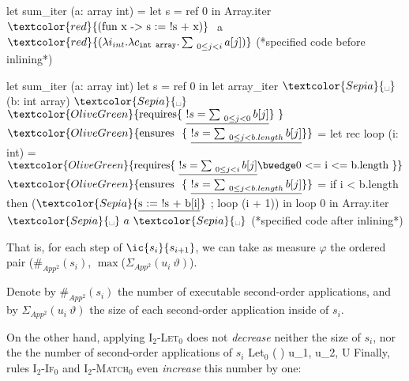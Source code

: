 \begin{adjustwidth}{-4em}{-2em}
\begin{footnotesize}
\begin{minipage}[t]{0.3\linewidth}
\begin{whycode}
   let sum_iter (a: array int) =		 
     let s = ref 0 in 
     Array.iter $\textcolor{red}{\text{(fun x -> s := !s + x)}}~$ a
                $\textcolor{red}{(\lambda i_{int}.\lambda c_{\texttt{int array}}. \sum_{~0\leq j < i} a[j])}$                                  
           (*specified code before inlining*)
\end{whycode}
\end{minipage}\hfill\vline
\begin{minipage}[t]{0.48\linewidth}
	\begin{whycode}  
   let sum_iter (a: array int)		
     let s = ref 0 in
     let array_iter $\textcolor{Sepia}{\text{\textvisiblespace}}$ (b: int array) $\textcolor{Sepia}{\text{\textvisiblespace}}$
     $\textcolor{OliveGreen}{\text{requires} \{~\underline{!s = \sum_{~0\leq j < 0} b[j]}}~\}$      
     $\textcolor{OliveGreen}{\text{ensures~~}\{~\underline{!s = \sum_{~0\leq j < b.length} b[j]}\}}$    
     = let rec loop (i: int) = 
         $\textcolor{OliveGreen}{ \text{requires} \{~\underline{!s = \sum_{~0\leq j < i} b[j] } \bwedge \text{0 <= i <= b.length}~\}}$
         $\textcolor{OliveGreen}{\text{ensures~~}\{~\underline{!s = \sum_{~0\leq j < b.length} b[j]}\}}$   
         = if i < b.length then  
         ($\textcolor{Sepia}{\text{\underline{s := !s + b[i]}}}$ ; 
          loop (i + 1)) 
       in loop 0   
     in Array.iter $\textcolor{Sepia}{\text{\textvisiblespace}}~a~\textcolor{Sepia}{\text{\textvisiblespace}}$   
               (*specified code after inlining*)
 	\end{whycode}
 	\end{minipage}
 \end{footnotesize}
\end{adjustwidth}

	
	
	That is, for each step  of $\ic{s_{i}}{s_{i+1}}$, we can take as measure $\varphi$ the ordered pair ($\#_{App^2}(s_{i})$, $\max$($\Sigma_{App^2}(u_{i}~\vartheta)$).
	
		Denote by $\#_{App^2}(s_{i})$ the number of executable second-order applications, and by $\Sigma_{App^2}(u_{i}~\vartheta)$ the size of each second-order application inside of $s_{i}$. 
	
		
On the other hand, applying \textsc{I$_2$-Let$_0$} does not \textit{decrease} neither the size of $s_{i}$, nor the the number of second-order applications of $s_{i}$
		\icrulehead
		{Let$_0$}
		{(\boldsymbol{(}\boldsymbol{)} \boldsymbol{\vartheta})}
		{} 
		{u_1, u_2, \vartheta \in U}	
 Finally, rules \textsc{I$_2$-If$_0$} and \textsc{I$_2$-Match$_0$} even \textit{increase} this number by one:


